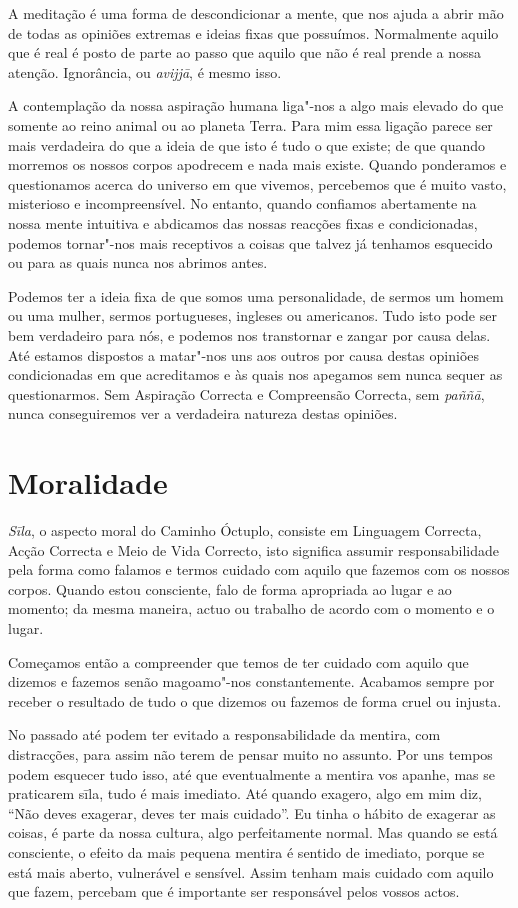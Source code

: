 A meditação é uma forma de descondicionar a mente, que nos ajuda a abrir mão de
todas as opiniões extremas e ideias fixas que possuímos. Normalmente aquilo que
é real é posto de parte ao passo que aquilo que não é real prende a nossa
atenção. Ignorância, ou \emph{avijjā}, é mesmo isso.

A contemplação da nossa aspiração humana liga"-nos a algo mais elevado do que
somente ao reino animal ou ao planeta Terra. Para mim essa ligação parece ser
mais verdadeira do que a ideia de que isto é tudo o que existe; de que quando
morremos os nossos corpos apodrecem e nada mais existe. Quando ponderamos e
questionamos acerca do universo em que vivemos, percebemos que é muito vasto,
misterioso e incompreensível. No entanto, quando confiamos abertamente na nossa
mente intuitiva e abdicamos das nossas reacções fixas e condicionadas, podemos
tornar"-nos mais receptivos a coisas que talvez já tenhamos esquecido ou para as
quais nunca nos abrimos antes.

Podemos ter a ideia fixa de que somos uma personalidade, de sermos um homem ou
uma mulher, sermos portugueses, ingleses ou americanos. Tudo isto pode ser bem
verdadeiro para nós, e podemos nos transtornar e zangar por causa delas. Até
estamos dispostos a matar"-nos uns aos outros por causa destas opiniões
condicionadas em que acreditamos e às quais nos apegamos sem nunca sequer as
questionarmos. Sem Aspiração Correcta e Compreensão Correcta, sem \emph{paññā},
nunca conseguiremos ver a verdadeira natureza destas opiniões.

\section{Moralidade}

\emph{Sīla}, o aspecto moral do Caminho Óctuplo, consiste em Linguagem Correcta,
Acção Correcta e Meio de Vida Correcto, isto significa assumir responsabilidade
pela forma como falamos e termos cuidado com aquilo que fazemos com os nossos
corpos. Quando estou consciente, falo de forma apropriada ao lugar e ao
momento; da mesma maneira, actuo ou trabalho de acordo com o momento e o lugar.

Começamos então a compreender que temos de ter cuidado com aquilo que dizemos e
fazemos senão magoamo"-nos constantemente. Acabamos sempre por receber o
resultado de tudo o que dizemos ou fazemos de forma cruel ou injusta.

No passado até podem ter evitado a responsabilidade da mentira, com distracções,
para assim não terem de pensar muito no assunto. Por uns tempos podem esquecer
tudo isso, até que eventualmente a mentira vos apanhe, mas se praticarem sīla,
tudo é mais imediato. Até quando exagero, algo em mim diz, “Não deves exagerar,
deves ter mais cuidado”. Eu tinha o hábito de exagerar as coisas, é parte da
nossa cultura, algo perfeitamente normal. Mas quando se está consciente, o
efeito da mais pequena mentira é sentido de imediato, porque se está mais
aberto, vulnerável e sensível. Assim tenham mais cuidado com aquilo que fazem,
percebam que é importante ser responsável pelos vossos actos.

